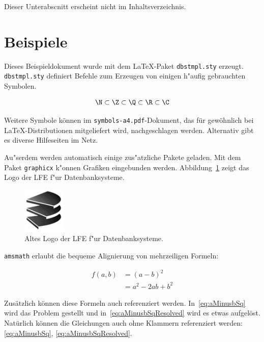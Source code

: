 Dieser Unterabscnitt erscheint nicht im Inhaltsverzeichnis.

\section{Beispiele}
Dieses Beispieldokument wurde mit dem \LaTeX-Paket {\tt dbstmpl.sty} erzeugt.
{\tt dbstmpl.sty} definiert Befehle zum Erzeugen von einigen
h"aufig gebrauchten Symbolen.

\begin{align}
  \N \subset \Z \subset \Q \subset \R \subset \C
\end{align}

Weitere Symbole k\"onnen im {\tt symbols-a4.pdf}-Dokument, das f\"ur
gew\"ohnlich bei \LaTeX-Distributionen mitgeliefert wird, nachgeschlagen
werden. Alternativ gibt es diverse Hilfeseiten im Netz.

Au"serdem werden automatisch einige zus"atzliche Pakete geladen.
Mit dem Paket {\tt graphicx} k"onnen Grafiken eingebunden werden.
Abbildung~\ref{fig:dbslogo} zeigt das Logo der LFE f"ur Datenbanksysteme.

\begin{figure}
  \begin{center}
    \includegraphics[width=2cm]{logo-dbs.png}
  \end{center}
  \caption{Altes Logo der LFE f"ur Datenbanksysteme.
    \label{fig:dbslogo} %
  }
\end{figure}

{\tt amsmath} erlaubt die bequeme Alignierung von mehrzeiligen Formeln:

\begin{align}
  f(a,b) &= (a-b)^2 \label{eq:aMinusbSq}\\
    &= a^2 - 2 a b + b^2 \label{eq:aMinusbSqResolved}
\end{align}

Zus\"atzlich k\"onnen diese Formeln auch referenziert werden. In~\eqref{eq:aMinusbSq}
wird das Problem gestellt und in~\eqref{eq:aMinusbSqResolved} wird es etwas
aufgel\"ost. Nat\"urlich k\"onnen die Gleichungen auch ohne Klammern
referenziert werden: \ref{eq:aMinusbSq}, \ref{eq:aMinusbSqResolved}.

